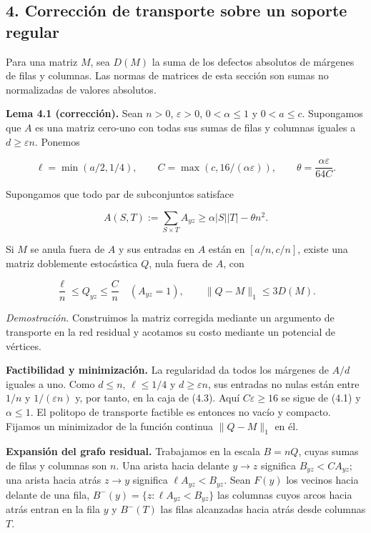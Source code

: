 \documentclass[spanish,11pt,a4paper]{article}
\begin{document}
\subsection{4. Corrección de transporte sobre un soporte regular}\label{correcciuxf3n-de-transporte-sobre-un-soporte-regular}

Para una matriz \(M\), sea \(D(M)\) la suma de los defectos absolutos de márgenes de filas y columnas. Las normas de matrices de esta sección son sumas no normalizadas de valores absolutos.

\textbf{Lema 4.1 (corrección).} Sean \(n>0\), \(\varepsilon>0\), \(0<\alpha\le1\) y \(0<a\le c\). Supongamos que \(A\) es una matriz cero-uno con todas sus sumas de filas y columnas iguales a \(d\ge\varepsilon n\). Ponemos

\nopagebreak[4]
\[\ell=\min(a/2,1/4),\qquad C=\max(c,16/(\alpha\varepsilon)),
\qquad\theta=\frac{\alpha\varepsilon}{64C}.\tag{4.1}\]

Supongamos que todo par de subconjuntos satisface

\nopagebreak[4]
\[A(S,T):=\sum_{S\times T}A_{yz}\ge\alpha|S||T|-\theta n^2.\tag{4.2}\]

Si \(M\) se anula fuera de \(A\) y sus entradas en \(A\) están en \([a/n,c/n]\), existe una matriz doblemente estocástica \(Q\), nula fuera de \(A\), con

\nopagebreak[4]
\[\frac\ell n\le Q_{yz}\le\frac Cn\quad(A_{yz}=1),\qquad
\|Q-M\|_1\le3D(M).\tag{4.3}\]

\emph{Demostración.} Construimos la matriz corregida mediante un argumento de transporte en la red residual y acotamos su costo mediante un potencial de vértices.

\textbf{Factibilidad y minimización.} La regularidad da todos los márgenes de \(A/d\) iguales a uno. Como \(d\le n\), \(\ell\le1/4\) y \(d\ge\varepsilon n\), sus entradas no nulas están entre \(1/n\) y \(1/(\varepsilon n)\) y, por tanto, en la caja de (4.3). Aquí \(C\varepsilon\ge16\) se sigue de (4.1) y \(\alpha\le1\). El politopo de transporte factible es entonces no vacío y compacto. Fijamos un minimizador de la función continua \(\|Q-M\|_1\) en él.

\textbf{Expansión del grafo residual.} Trabajamos en la escala \(B=nQ\), cuyas sumas de filas y columnas son \(n\). Una arista hacia delante \(y\to z\) significa \(B_{yz}<CA_{yz}\); una arista hacia atrás \(z\to y\) significa \(\ell A_{yz}<B_{yz}\). Sean \(F(y)\) los vecinos hacia delante de una fila, \(B^-(y)=\{z:\ell A_{yz}<B_{yz}\}\) las columnas cuyos arcos hacia atrás entran en la fila \(y\) y \(B^-(T)\) las filas alcanzadas hacia atrás desde columnas \(T\).
\end{document}
